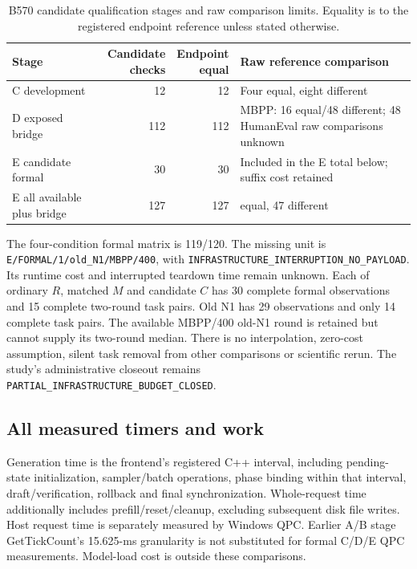 \begin{table}[t]\centering\small
\caption{B570 candidate qualification stages and raw comparison limits. Equality is to the registered endpoint reference unless stated otherwise.}
\label{tab:b570_qualification}
\begin{tabularx}{\linewidth}{@{}>{\raggedright\arraybackslash}p{.25\linewidth}rr>{\raggedright\arraybackslash}X@{}}\toprule
Stage & \shortstack{Candidate\\checks} & \shortstack{Endpoint\\equal} & Raw reference comparison\\\midrule
C development & 12 & 12 & Four equal, eight different\\
D exposed bridge & 112 & 112 & MBPP: 16 equal/48 different; 48 HumanEval raw comparisons unknown\\
E candidate formal & 30 & 30 & Included in the E total below; suffix cost retained\\
E all available plus bridge & 127 & 127 & 80 equal, 47 different\\\bottomrule
\end{tabularx}
\end{table}

The four-condition formal matrix is 119/120. The missing unit is \nolinkurl{E/FORMAL/1/old_N1/MBPP/400}, with \nolinkurl{INFRASTRUCTURE_INTERRUPTION_NO_PAYLOAD}. Its runtime cost and interrupted teardown time remain unknown. Each of ordinary $R$, matched $M$ and candidate $C$ has 30 complete formal observations and 15 complete two-round task pairs. Old N1 has 29 observations and only 14 complete task pairs. The available MBPP/400 old-N1 round is retained but cannot supply its two-round median. There is no interpolation, zero-cost assumption, silent task removal from other comparisons or scientific rerun. The study's administrative closeout remains \nolinkurl{PARTIAL_INFRASTRUCTURE_BUDGET_CLOSED}.

\subsection{All measured timers and work}
\label{supp:b570_costs}
Generation time is the frontend's registered C++ interval, including pending-state initialization, sampler/batch operations, phase binding within that interval, draft/verification, rollback and final synchronization. Whole-request time additionally includes prefill/reset/cleanup, excluding subsequent disk file writes. Host request time is separately measured by Windows QPC. Earlier A/B stage GetTickCount's 15.625-ms granularity is not substituted for formal C/D/E QPC measurements. Model-load cost is outside these comparisons.

